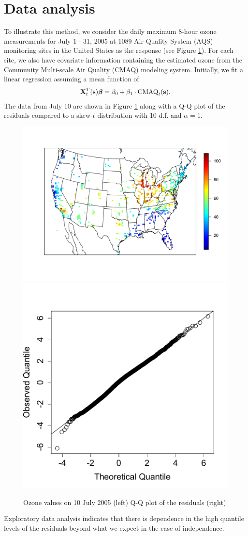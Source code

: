 \documentclass[11pt]{article}
\begin{document}
\section{Data analysis}\label{s:analysis}
To illustrate this method, we consider the daily maximum 8-hour ozone measurements for July 1 - 31, 2005 at 1089 Air Quality System (AQS) monitoring sites in the United States as the response (see Figure \ref{fig:ozone}).
For each site, we also have covariate information containing the estimated ozone from the Community Multi-scale Air Quality (CMAQ) modeling system.
Initially, we fit a linear regression assuming a mean function of
\begin{align}
  \mbox{\bf X}^T_t(\mbox{\bf s}) \mbox{\boldmath $\beta$} = \beta_0 + \beta_1 \cdot \text{CMAQ}_t(\mbox{\bf s}). \label{eq:datamean}
\end{align}
The data from July 10 are shown in Figure \ref{fig:ozone} along with a Q-Q plot of the residuals compared to a skew-$t$ distribution with 10 d.f. and $\alpha = 1$.
\begin{figure}
  \centering
  \includegraphics[width=0.56\linewidth]{plots/ozone-10jul-us.pdf}
  \includegraphics[width=0.41\linewidth]{plots/qq-res.pdf}
  \caption{Ozone values on 10 July 2005 (left) Q-Q plot of the residuals (right)}
  \label{fig:ozone}
\end{figure}
Exploratory data analysis indicates that there is dependence in the high quantile levels of the residuals beyond what we expect in the case of independence.
\end{document}
